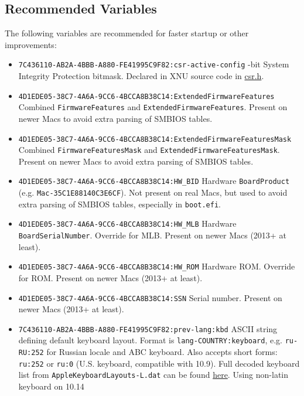 \documentclass[]{article}
\providecommand{\tightlist}{%
  \setlength{\itemsep}{0pt}\setlength{\parskip}{0pt}}
\begin{document}
\subsection{Recommended Variables}\label{nvramvarsrec}

The following variables are recommended for faster startup or other
improvements:

\begin{itemize}
\tightlist
\item
  \texttt{7C436110-AB2A-4BBB-A880-FE41995C9F82:csr-active-config}
  -bit System Integrity Protection bitmask. Declared in XNU source code in
  \href{https://opensource.apple.com/source/xnu/xnu-4570.71.2/bsd/sys/csr.h.auto.html}{csr.h}.
\item
  \texttt{4D1EDE05-38C7-4A6A-9CC6-4BCCA8B38C14:ExtendedFirmwareFeatures}
  \break
  Combined \texttt{FirmwareFeatures} and \texttt{ExtendedFirmwareFeatures}. Present on
  newer Macs to avoid extra parsing of SMBIOS tables.
\item
  \texttt{4D1EDE05-38C7-4A6A-9CC6-4BCCA8B38C14:ExtendedFirmwareFeaturesMask}
  \break
  Combined \texttt{FirmwareFeaturesMask} and \texttt{ExtendedFirmwareFeaturesMask}.
  Present on newer Macs to avoid extra parsing of SMBIOS tables.
\item
  \texttt{4D1EDE05-38C7-4A6A-9CC6-4BCCA8B38C14:HW\_BID}
  \break
  Hardware \texttt{BoardProduct} (e.g. \texttt{Mac-35C1E88140C3E6CF}). Not present on
  real Macs, but used to avoid extra parsing of SMBIOS tables, especially in \texttt{boot.efi}.
\item
  \texttt{4D1EDE05-38C7-4A6A-9CC6-4BCCA8B38C14:HW\_MLB}
  \break
  Hardware \texttt{BoardSerialNumber}. Override for MLB. Present on newer Macs (2013+ at least).
\item
  \texttt{4D1EDE05-38C7-4A6A-9CC6-4BCCA8B38C14:HW\_ROM}
  \break
  Hardware ROM. Override for ROM. Present on newer Macs (2013+ at least).
\item
  \texttt{4D1EDE05-38C7-4A6A-9CC6-4BCCA8B38C14:SSN}
  \break
  Serial number. Present on newer Macs (2013+ at least).
\item
  \texttt{7C436110-AB2A-4BBB-A880-FE41995C9F82:prev-lang:kbd}
  \break
  ASCII string defining default keyboard layout. Format is \texttt{lang-COUNTRY:keyboard},
  e.g. \texttt{ru-RU:252} for Russian locale and ABC keyboard. Also accepts short forms:
  \texttt{ru:252} or \texttt{ru:0} (U.S. keyboard, compatible with 10.9). Full decoded
  keyboard list from \texttt{AppleKeyboardLayouts-L.dat} can be found
  \href{https://github.com/acidanthera/OpenCorePkg/tree/master/Utilities/AppleKeyboardLayouts}{here}. Using non-latin keyboard on 10.14

\end{itemize}
\end{document}
